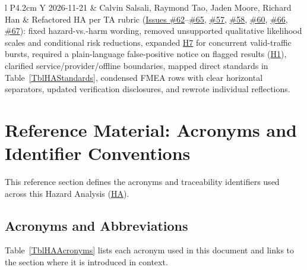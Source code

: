 \documentclass[11pt]{article}
\newcommand{\HA}{\hyperlink{ha-acr-ha}{HA}}
\begin{document}
\begin{tabularx}{\textwidth}{l P{4.2cm} Y}
2026-11-21 & Calvin Salsali, Raymond Tao, Jaden Moore, Richard Han & Refactored HA per TA rubric (\href{https://github.com/richy1337/Verity/issues/62}{Issues \#62}--\href{https://github.com/richy1337/Verity/issues/65}{\#65}, \href{https://github.com/richy1337/Verity/issues/57}{\#57}, \href{https://github.com/richy1337/Verity/issues/58}{\#58}, \href{https://github.com/richy1337/Verity/issues/60}{\#60}, \href{https://github.com/richy1337/Verity/issues/66}{\#66}, \href{https://github.com/richy1337/Verity/issues/67}{\#67}): fixed hazard-vs.-harm wording, removed unsupported qualitative likelihood scales and conditional risk reductions, expanded \hyperref[haz:H7]{H7} for concurrent valid-traffic bursts, required a plain-language false-positive notice on flagged results (\hyperref[haz:H1]{H1}), clarified service/provider/offline boundaries, mapped direct standards in Table~\ref{TblHAStandards}, condensed FMEA rows with clear horizontal separators, updated verification disclosures, and rewrote individual reflections.\\
\bottomrule
\end{tabularx}

\newpage
\tableofcontents
\newpage
\listoftables
\listoffigures

\newpage

\section*{Reference Material: Acronyms and Identifier Conventions}
\label{sec:ha-acronyms}

This reference section defines the acronyms and traceability identifiers used across this Hazard Analysis (\HA{}).

\subsection*{Acronyms and Abbreviations}

Table~\ref{TblHAAcronyms} lists each acronym used in this document and links to the section where it is introduced in context.
\end{document}

